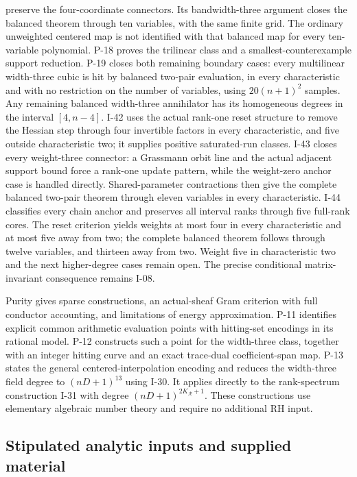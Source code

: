 preserve the four-coordinate connectors. Its bandwidth-three argument closes the balanced theorem through ten variables, with the same finite grid. The ordinary unweighted centered map is not identified with that balanced map for every ten-variable polynomial. P-18 proves the trilinear class and a smallest-counterexample support reduction. P-19 closes both remaining boundary cases: every multilinear width-three cubic is hit by balanced two-pair evaluation, in every characteristic and with no restriction on the number of variables, using $20(n+1)^2$ samples. Any remaining balanced width-three annihilator has its homogeneous degrees in the interval $[4,n-4]$. I-42 uses the actual rank-one reset structure to remove the Hessian step through four invertible factors in every characteristic, and five outside characteristic two; it supplies positive saturated-run classes. I-43 closes every weight-three connector: a Grassmann orbit line and the actual adjacent support bound force a rank-one update pattern, while the weight-zero anchor case is handled directly. Shared-parameter contractions then give the complete balanced two-pair theorem through eleven variables in every characteristic. I-44 classifies every chain anchor and preserves all interval ranks through five full-rank cores. The reset criterion yields weights at most four in every characteristic and at most five away from two; the complete balanced theorem follows through twelve variables, and thirteen away from two. Weight five in characteristic two and the next higher-degree cases remain open. The precise conditional matrix-invariant consequence remains I-08.

Purity gives sparse constructions, an actual-sheaf Gram criterion with full conductor accounting, and limitations of energy approximation. P-11 identifies explicit common arithmetic evaluation points with hitting-set encodings in its rational model. P-12 constructs such a point for the width-three class, together with an integer hitting curve and an exact trace-dual coefficient-span map. P-13 states the general centered-interpolation encoding and reduces the width-three field degree to $(nD+1)^{13}$ using I-30. It applies directly to the rank-spectrum construction I-31 with degree $(nD+1)^{2K_{\mathcal R}+1}$. These constructions use elementary algebraic number theory and require no additional RH input.

\subsection{Stipulated analytic inputs and supplied material}


